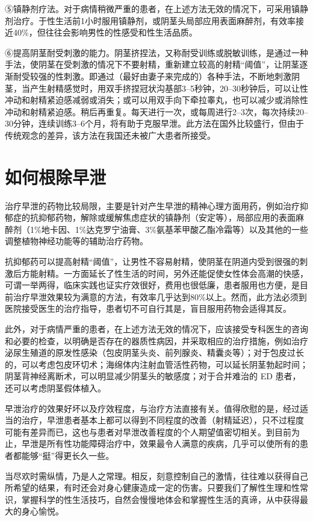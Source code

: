 \documentclass[12pt,UTF8]{ctexbook}
\begin{document}
⑤镇静剂疗法。对于病情稍微严重的患者，在上述方法无效的情况下，可采用镇静剂治疗。于性生活前1小时服用镇静剂，或阴茎头局部应用表面麻醉剂，有效率接近40\%，但往往会影响男性的性感受和性生活品质。

⑥提高阴茎耐受刺激的能力。阴茎挤捏法，又称耐受训练或脱敏训练，是通过一种手法，使阴茎在受刺激的情况下不要射精，重新建立较高的射精“阈值”，让阴茎逐渐耐受较强的性刺激。即通过（最好由妻子来完成的）各种手法，不断地刺激阴茎，当产生射精感觉时，用双手挤捏冠状沟基部3--5秒钟，20--30秒钟后，可以让性冲动和射精紧迫感减弱或消失；或可以用双手向下牵拉睾丸，也可以减少或消除性冲动和射精紧迫感。稍后再重复。每天进行一次，或每周进行2--3次，每次持续20--30分钟，连续训练3--6个月，将有助于克服早泄。此方法在国外比较盛行，但由于传统观念的差异，该方法在我国还未被广大患者所接受。

\section{如何根除早泄}

治疗早泄的药物比较局限，主要是针对产生早泄的精神心理方面用药，例如治疗抑郁症的抗抑郁药物，解除或缓解焦虑症状的镇静剂（安定等），局部应用的表面麻醉剂（1\%地卡因、1\%达克罗宁油膏、3\%氨基苯甲酸乙酯冷霜等）以及其他的一些调整植物神经功能等的辅助治疗药物。

抗抑郁药可以提高射精“阈值”，让男性不容易射精，使阴茎在阴道内受到很强的刺激后方能射精。一方面延长了性生活的时间，另外还能促使女性体会高潮的快感，可谓一举两得，临床实践也证实疗效很好，费用也很低廉，患者服用也方便，是目前治疗早泄效果较为满意的方法，有效率几乎达到80\%以上。然而，此方法必须到医院接受医生的治疗指导，患者切不可自行其是，盲目服用药物会适得其反。

此外，对于病情严重的患者，在上述方法无效的情况下，应该接受专科医生的咨询和必要的检查，以明确是否存在的器质性病因，并采取相应的治疗措施，例如治疗泌尿生殖道的原发性感染（包皮阴茎头炎、前列腺炎、精囊炎等）；对于包皮过长的，可以考虑包皮环切术；海绵体内注射血管活性药物，可以延长阴茎勃起时间；阴茎背神经离断术，可以明显减少阴茎头的敏感度；对于合并难治的 ED 患者，还可以考虑阴茎假体植入。

早泄治疗的效果好坏以及疗效程度，与治疗方法直接有关。值得欣慰的是，经过适当的治疗，早泄患者基本上都可以得到不同程度的改善（射精延迟），只不过程度可能有差异而已，这也与患者对早泄改善程度的个人期望值密切相关。到目前为止，早泄是所有性功能障碍治疗中，效果最令人满意的疾病，几乎可以使所有的患者都能够“挺”得更长久一些。

当尽欢时需纵情，乃是人之常理。相反，刻意控制自己的激情，往往难以获得自己所希望的结果，有时还会对身心健康造成一定的伤害。只要我们了解性生理和性常识，掌握科学的性生活技巧，自然会慢慢地体会和掌握性生活的真谛，从中获得最大的身心愉悦。
\end{document}
